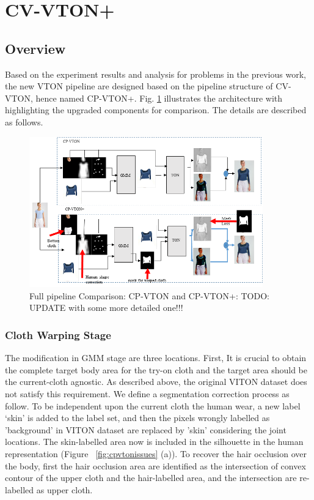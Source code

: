 \section{CV-VTON+} \label{section:cpvton+}

\subsection{Overview} 
Based on the experiment results and analysis for problems in the previous work, the new VTON pipeline are designed based on the pipeline structure of CV-VTON, hence named CP-VTON+. Fig. \ref{fig:piepline} illustrates the architecture with highlighting the upgraded components for comparison. The details are described as follows.

\begin{figure}
\centering
\includegraphics[height=6.5cm, scale=1]{figures/cpvton+pipeline.png}   
\caption{Full pipeline Comparison: CP-VTON and CP-VTON+: TODO: UPDATE with some more detailed one!!!}
\label{fig:piepline}
\end{figure}

\subsubsection{Cloth Warping Stage}

The modification in GMM stage are three locations. 
First, It is crucial to obtain the complete target body area for the try-on cloth and the target area should be the current-cloth agnostic. As described above, the original VITON dataset does not satisfy this requirement. We define a segmentation correction process as follow.  
To be independent upon the current cloth the human wear, a new label ‘skin’ is added to the label set, and then  the pixels wrongly labelled as 'background' in VITON dataset are replaced by 'skin' considering the joint locations. The skin-labelled area now is included in the silhouette in the human representation (Figure  ~\ref{fig:cpvtonissues} (a)).
To recover the hair occlusion over the body, first the hair occlusion area are identified as the intersection of convex contour of the upper cloth and the hair-labelled area, and the intersection are re-labelled as upper cloth.   

